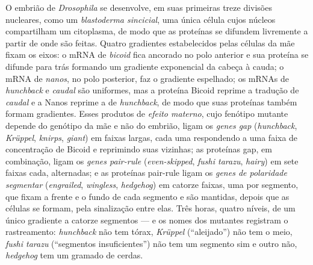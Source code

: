 \begin{definition}\label{def:b3:developmental-genetics:hierarchy}
O embrião de \emph{Drosophila} se desenvolve, em suas primeiras treze
divisões nucleares, como um \emph{blastoderma sincicial}, uma única
célula cujos núcleos compartilham um citoplasma, de modo que as
proteínas se difundem livremente a partir de onde são feitas. Quatro
gradientes estabelecidos pelas células da mãe fixam os eixos: o mRNA de
\emph{bicoid} fica ancorado no polo anterior e sua proteína se difunde
para trás formando um gradiente exponencial da cabeça à cauda; o mRNA de
\emph{nanos}, no polo posterior, faz o gradiente espelhado; os mRNAs de
\emph{hunchback} e \emph{caudal} são uniformes, mas a proteína Bicoid
reprime a tradução de \emph{caudal} e a Nanos reprime a de
\emph{hunchback}, de modo que suas proteínas também formam gradientes.
Esses produtos de \emph{efeito materno}, cujo fenótipo mutante depende
do genótipo da mãe e não do embrião, ligam os \emph{genes gap}
(\emph{hunchback}, \emph{Krüppel}, \emph{knirps}, \emph{giant}) em
faixas largas, cada uma respondendo a uma faixa de concentração de
Bicoid e reprimindo suas vizinhas; as proteínas gap, em combinação,
ligam os \emph{genes pair-rule} (\emph{even-skipped}, \emph{fushi
tarazu}, \emph{hairy}) em sete faixas cada, alternadas; e as proteínas
pair-rule ligam os \emph{genes de polaridade segmentar}
(\emph{engrailed}, \emph{wingless}, \emph{hedgehog}) em catorze faixas,
uma por segmento, que fixam a frente e o fundo de cada segmento e são
mantidas, depois que as células se formam, pela sinalização entre elas.
Três horas, quatro níveis, de um único gradiente a catorze segmentos ---
e os nomes dos mutantes registram o rastreamento: \emph{hunchback} não
tem tórax, \emph{Krüppel} (``aleijado'') não tem o meio, \emph{fushi
tarazu} (``segmentos insuficientes'') não tem um segmento sim e outro
não, \emph{hedgehog} tem um gramado de cerdas.
\end{definition}

